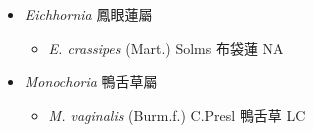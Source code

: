 
  \begin{itemize}
 \item[] \textit{Eichhornia} 鳳眼蓮屬
                                
  \begin{itemize}
        \item[] \textit{E. crassipes} (Mart.) Solms  布袋蓮   NA
  \end{itemize}
 \item[] \textit{Monochoria} 鴨舌草屬
                                
  \begin{itemize}
        \item[] \textit{M. vaginalis} (Burm.f.) C.Presl  鴨舌草   LC
  \end{itemize}
  \end{itemize}
